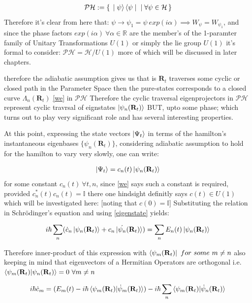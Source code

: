 \documentclass[8pt, twocoloumn]{article}
\begin{document}
\begin{align}
\mathcal{PH}:= \set{\ket{\psi}\bra{\psi}|\forall \psi \in \mathcal{H}}
\end{align}
Therefore it's clear from here that: $\psi \to \psi_1 = \psi \ exp(i\alpha) \implies W_{\psi} = W_{\psi_1}$, and since the phase factors $exp(i\alpha) \ \forall \alpha \in \mathbb{R}$ are the member's of the 1-paramter family of Unitary Transformations $U(1)$ or simply the lie group $U(1)$ it's formal to consider: $\mathcal{PH}= \mathcal{H}/ U(1)$ more of which will be discussed in later chapters.

therefore the adiabatic assumption gives us that is $\textbf{R}_t$ traverses some cyclic or closed path in the Parameter Space then the pure-states corresponds to a closed curve $\Lambda_n(\textbf{R}_t)$ \ref{we} in $\mathcal{PH}$
Therefore the cyclic traversal eigenprojectors in $\mathcal{PH}$ represent cyclic travrsal of eignstates  
$\ket{\psi_n(\textbf{R}_t)}$ BUT, upto some phase; which turns out to play very significant  role and has several interesting properties. 

At this point, expressing the state vectors $\ket{\Psi_t}$ in terms of the hamilton's instantaneous eigenbases $\{\psi_n(\textbf{R}_t)\}$, considering adiabatic assumption to hold for the hamilton to vary very slowly, one can write:

\begin{align}
\ket{\Psi_t}=c_n(t)\ket{\psi_n(\textbf{R}_t)}
\end{align}
for some constant $c_n(t) \ \forall t,n$, since \ref{we} says such a constant is required, provided $c^*_n(t)c_n(t)=\mathbb{I}$ there one hindsight definitly says $c(t) \in U(1)$ which will be investigated here: [noting that $c(0)=\mathbb{I}$] Substituting the relation in Schrödinger's equation and using \ref{eigenstate} yields:

\begin{align}
i\hbar \sum_{n}(\dot{c}_n\ket{\psi_n(\textbf{R}_t)}+c_n \ket{\dot{\psi_n}(\textbf{R}_t)})=\sum_{n}E_n(t)\ket{\psi_n(\textbf{R}_t)}
\end{align}

Therefore inner-product of this expression with $\bra{\psi_m(\textbf{R}_t)} \ for \ some \ m \neq n$ also keeping in mind that eigenvectors of a Hermitian Operators are orthogonal i.e. $\braket{\psi_m(\textbf{R}_t)|\psi_n(\textbf{R}_t)}=0 \ \forall m\neq n$ 

\begin{align}{\label{ffs}}
i\hbar \dot{c}_m=(E_m(t)-i\hbar \braket{\psi_m(\textbf{R}_t)|\dot{\psi}_m(\textbf{R}_t)})-i\hbar\sum_{n}\braket{\psi_m(\textbf{R}_t)|\dot{\psi}_n(\textbf{R}_t)}
\end{align}
\end{document}
